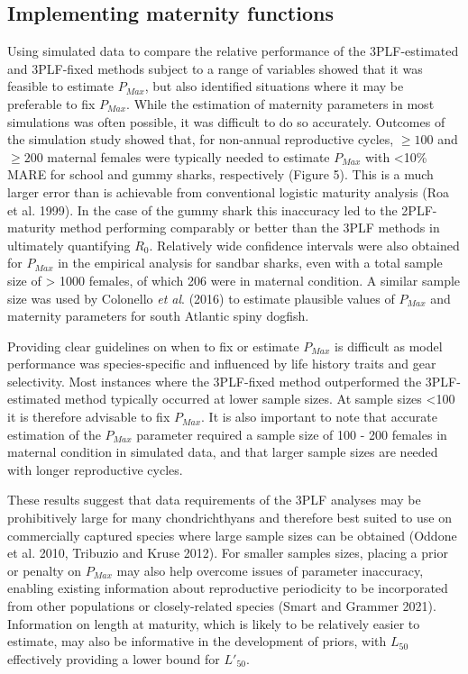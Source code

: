 \documentclass[
]{article}
\begin{document}
\subsection{Implementing maternity functions}\label{implementing-maternity-functions}

Using simulated data to compare the relative performance of the 3PLF-estimated and 3PLF-fixed methods subject to a range of variables showed that it was feasible to estimate \(P_{Max}\), but also identified situations where it may be preferable to fix \(P_{Max}\). While the estimation of maternity parameters in most simulations was often possible, it was difficult to do so accurately. Outcomes of the simulation study showed that, for non-annual reproductive cycles, \(\geq100\) and \(\geq200\) maternal females were typically needed to estimate \(P_{Max}\) with \textless10\% MARE for school and gummy sharks, respectively (Figure 5). This is a much larger error than is achievable from conventional logistic maturity analysis (Roa et al. 1999). In the case of the gummy shark this inaccuracy led to the 2PLF-maturity method performing comparably or better than the 3PLF methods in ultimately quantifying \(R_0\). Relatively wide confidence intervals were also obtained for \(P_{Max}\) in the empirical analysis for sandbar sharks, even with a total sample size of \textgreater{} 1000 females, of which 206 were in maternal condition. A similar sample size was used by Colonello \emph{et al}. (2016) to estimate plausible values of \(P_{Max}\) and maternity parameters for south Atlantic spiny dogfish.

Providing clear guidelines on when to fix or estimate \(P_{Max}\) is difficult as model performance was species-specific and influenced by life history traits and gear selectivity. Most instances where the 3PLF-fixed method outperformed the 3PLF-estimated method typically occurred at lower sample sizes. At sample sizes \textless100 it is therefore advisable to fix \(P_{Max}\). It is also important to note that accurate estimation of the \(P_{Max}\) parameter required a sample size of 100 - 200 females in maternal condition in simulated data, and that larger sample sizes are needed with longer reproductive cycles.

These results suggest that data requirements of the 3PLF analyses may be prohibitively large for many chondrichthyans and therefore best suited to use on commercially captured species where large sample sizes can be obtained (Oddone et al. 2010, Tribuzio and Kruse 2012). For smaller samples sizes, placing a prior or penalty on \(P_{Max}\) may also help overcome issues of parameter inaccuracy, enabling existing information about reproductive periodicity to be incorporated from other populations or closely-related species (Smart and Grammer 2021). Information on length at maturity, which is likely to be relatively easier to estimate, may also be informative in the development of priors, with \(L_{50}\) effectively providing a lower bound for \(L'_{50}\).
\end{document}
